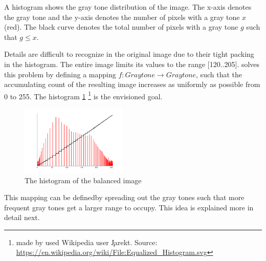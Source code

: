       A histogram shows the gray tone distribution of the image.
      The x-axis denotes the gray tone and the y-axis denotes the
      number of pixels with a gray tone $x$ (red). The black curve denotes the
      total number of pixels with a gray tone $g$ such that $g \leq x$.

      Details are difficult to recognize in the original image
      due to their tight packing in the histogram. The
      entire image limits its values to the range [120..205].
      \algo solves this problem by defining a mapping
      $f: Graytone \rightarrow Graytone$, such that the accumulating count
      of the resulting image increases as uniformly as possible from 0 to 255.
      The histogram \ref{fig:hist-eq}
      \footnote{made by used Wikipedia user \c{Jarekt}. Source: \url{https://en.wikipedia.org/wiki/File:Equalized_Histogram.svg}}
      is the envisioned goal.
      
      \begin{figure}[h]
        \centering
        \includegraphics[width=0.45\textwidth]{hist-eq}
        \caption{The histogram of the balanced image}
        \label{fig:hist-eq}
      \end{figure}
      This mapping can be definedby spreading out the gray tones such that more
      frequent gray tones get a larger range to occupy. This idea is
      explained more in detail next.
      
